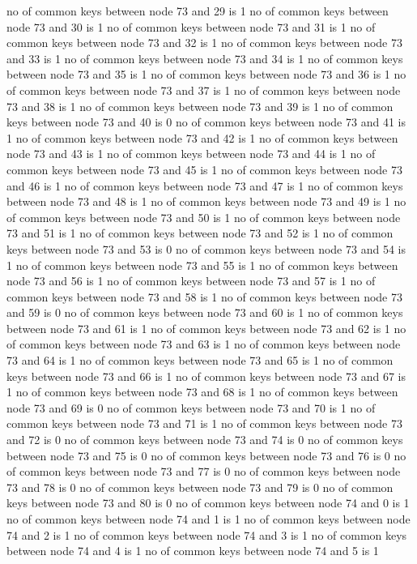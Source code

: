no of common keys between node 73 and 29 is 1
no of common keys between node 73 and 30 is 1
no of common keys between node 73 and 31 is 1
no of common keys between node 73 and 32 is 1
no of common keys between node 73 and 33 is 1
no of common keys between node 73 and 34 is 1
no of common keys between node 73 and 35 is 1
no of common keys between node 73 and 36 is 1
no of common keys between node 73 and 37 is 1
no of common keys between node 73 and 38 is 1
no of common keys between node 73 and 39 is 1
no of common keys between node 73 and 40 is 0
no of common keys between node 73 and 41 is 1
no of common keys between node 73 and 42 is 1
no of common keys between node 73 and 43 is 1
no of common keys between node 73 and 44 is 1
no of common keys between node 73 and 45 is 1
no of common keys between node 73 and 46 is 1
no of common keys between node 73 and 47 is 1
no of common keys between node 73 and 48 is 1
no of common keys between node 73 and 49 is 1
no of common keys between node 73 and 50 is 1
no of common keys between node 73 and 51 is 1
no of common keys between node 73 and 52 is 1
no of common keys between node 73 and 53 is 0
no of common keys between node 73 and 54 is 1
no of common keys between node 73 and 55 is 1
no of common keys between node 73 and 56 is 1
no of common keys between node 73 and 57 is 1
no of common keys between node 73 and 58 is 1
no of common keys between node 73 and 59 is 0
no of common keys between node 73 and 60 is 1
no of common keys between node 73 and 61 is 1
no of common keys between node 73 and 62 is 1
no of common keys between node 73 and 63 is 1
no of common keys between node 73 and 64 is 1
no of common keys between node 73 and 65 is 1
no of common keys between node 73 and 66 is 1
no of common keys between node 73 and 67 is 1
no of common keys between node 73 and 68 is 1
no of common keys between node 73 and 69 is 0
no of common keys between node 73 and 70 is 1
no of common keys between node 73 and 71 is 1
no of common keys between node 73 and 72 is 0
no of common keys between node 73 and 74 is 0
no of common keys between node 73 and 75 is 0
no of common keys between node 73 and 76 is 0
no of common keys between node 73 and 77 is 0
no of common keys between node 73 and 78 is 0
no of common keys between node 73 and 79 is 0
no of common keys between node 73 and 80 is 0
no of common keys between node 74 and 0 is 1
no of common keys between node 74 and 1 is 1
no of common keys between node 74 and 2 is 1
no of common keys between node 74 and 3 is 1
no of common keys between node 74 and 4 is 1
no of common keys between node 74 and 5 is 1

